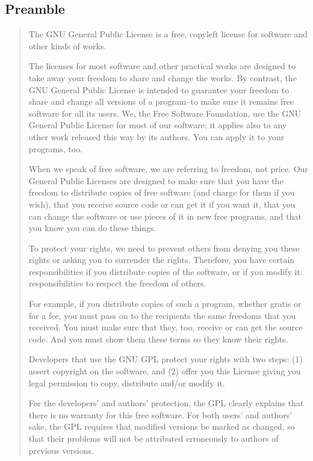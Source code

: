 \documentclass[letterpaper,10pt,english]{sphinxmanual}
\begin{document}
\subsection{Preamble}
\label{docs/license:preamble}\begin{quote}

The GNU General Public License is a free, copyleft license for
software and other kinds of works.

The licenses for most software and other practical works are designed
to take away your freedom to share and change the works. By contrast,
the GNU General Public License is intended to guarantee your freedom to
share and change all versions of a program--to make sure it remains free
software for all its users.  We, the Free Software Foundation, use the
GNU General Public License for most of our software; it applies also to
any other work released this way by its authors.  You can apply it to
your programs, too.

When we speak of free software, we are referring to freedom, not
price.  Our General Public Licenses are designed to make sure that you
have the freedom to distribute copies of free software (and charge for
them if you wish), that you receive source code or can get it if you
want it, that you can change the software or use pieces of it in new
free programs, and that you know you can do these things.

To protect your rights, we need to prevent others from denying you
these rights or asking you to surrender the rights.  Therefore, you have
certain responsibilities if you distribute copies of the software, or if
you modify it: responsibilities to respect the freedom of others.

For example, if you distribute copies of such a program, whether
gratis or for a fee, you must pass on to the recipients the same
freedoms that you received.  You must make sure that they, too, receive
or can get the source code.  And you must show them these terms so they
know their rights.

Developers that use the GNU GPL protect your rights with two steps:
(1) assert copyright on the software, and (2) offer you this License
giving you legal permission to copy, distribute and/or modify it.

For the developers' and authors' protection, the GPL clearly explains
that there is no warranty for this free software.  For both users' and
authors' sake, the GPL requires that modified versions be marked as
changed, so that their problems will not be attributed erroneously to
authors of previous versions.


\end{quote}
\end{document}
